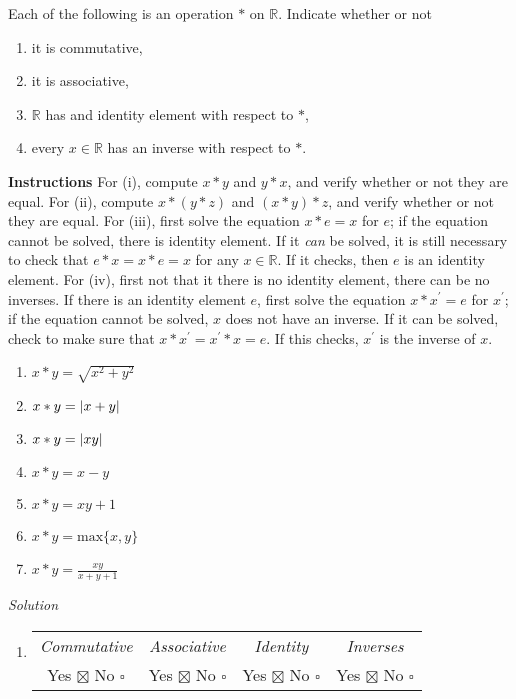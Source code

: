 \documentclass[12pt]{article}
\DeclarePairedDelimiter{\abs}{\lvert}{\rvert}
\begin{document}
\begin{flushleft}
Each of the following is an operation $*$ on $\mathbb{R}$. Indicate whether or not

\renewcommand{\theenumi}{(\roman{enumi})}
\begin{enumerate}
  \item it is commutative,
  \item it is associative,
  \item $\mathbb{R}$ has and identity element with respect to $*$,
  \item every $x \in \mathbb{R}$ has an inverse with respect to $*$.
\end{enumerate}

\textbf{Instructions} For (i), compute $x * y$ and $y * x$, and verify whether or not they are equal. For (ii), compute $x * (y * z)$ and $(x * y) * z$, and verify whether or not they are equal. For (iii), first solve the equation $x * e = x$ for $e$; if the equation cannot be solved, there is identity element. If it \textit{can} be solved, it is still necessary to check that $e * x = x * e = x$ for any $x \in \mathbb{R}$. If it checks, then $e$ is an identity element. For (iv), first not that it there is no identity element, there can be no inverses. If there is an identity element $e$, first solve the equation $x * x^{'} = e$ for $x^{'}$; if the equation cannot be solved, $x$ does not have an inverse. If it can be solved, check to make sure that $x * x^{'} = x^{'} * x = e$. If this checks, $x^{'}$ is the inverse of $x$.

\renewcommand{\theenumi}{\arabic{enumi}}
\begin{enumerate}

\item $x * y = \sqrt{x^2 + y^2}$
\item $x * y = \abs{ x + y }$
\item $x * y = \abs{ xy }$
\item $x * y = x - y $
\item $x * y = xy + 1 $
\item $x * y = \text{max}\{x,y\}$
\item $x * y = \frac{xy}{x + y + 1}$
\end{enumerate}

\textit{Solution}

\begin{enumerate}

\item
\begin{tabular}{c c c c}
\textit{Commutative} & \textit{Associative} & \textit{Identity} & \textit{Inverses} \\
Yes $\boxtimes$ No $\square$ & Yes $\boxtimes$ No $\square$ & Yes $\boxtimes$ No $\square$ & Yes $\boxtimes$ No $\square$ \\
\end{tabular}
\end{enumerate}
\renewcommand{\theenumi}{(\roman{enumi})}
\begin{enumerate}


\end{enumerate}
\end{flushleft}
\end{document}
